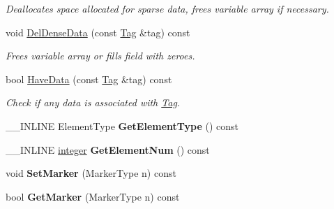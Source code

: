 \begin{DoxyCompactItemize}
\begin{DoxyCompactList}\small\item\em Deallocates space allocated for sparse data, frees variable array if necessary. \end{DoxyCompactList}\item 
\hypertarget{classINMOST_1_1Storage_af528c745af38f31bf6b8b77c1eafdb8a}{void \hyperlink{classINMOST_1_1Storage_af528c745af38f31bf6b8b77c1eafdb8a}{Del\-Dense\-Data} (const \hyperlink{classINMOST_1_1Tag}{Tag} \&tag) const }\label{classINMOST_1_1Storage_af528c745af38f31bf6b8b77c1eafdb8a}

\begin{DoxyCompactList}\small\item\em Frees variable array or fills field with zeroes. \end{DoxyCompactList}\item 
\hypertarget{classINMOST_1_1Storage_ab94105e63f94f9799ff9a58280d0bf63}{bool \hyperlink{classINMOST_1_1Storage_ab94105e63f94f9799ff9a58280d0bf63}{Have\-Data} (const \hyperlink{classINMOST_1_1Tag}{Tag} \&tag) const }\label{classINMOST_1_1Storage_ab94105e63f94f9799ff9a58280d0bf63}

\begin{DoxyCompactList}\small\item\em Check if any data is associated with \hyperlink{classINMOST_1_1Tag}{Tag}. \end{DoxyCompactList}\item 
\hypertarget{classINMOST_1_1Storage_ae6928532b6665a12831d13293c4c7b31}{\-\_\-\-\_\-\-I\-N\-L\-I\-N\-E Element\-Type {\bfseries Get\-Element\-Type} () const }\label{classINMOST_1_1Storage_ae6928532b6665a12831d13293c4c7b31}

\item 
\hypertarget{classINMOST_1_1Storage_ae29350683bf09e402e0343f758f3e9d1}{\-\_\-\-\_\-\-I\-N\-L\-I\-N\-E \hyperlink{classINMOST_1_1Storage_aec96942bc647417a801e2895b45964d2}{integer} {\bfseries Get\-Element\-Num} () const }\label{classINMOST_1_1Storage_ae29350683bf09e402e0343f758f3e9d1}

\item 
\hypertarget{classINMOST_1_1Storage_a9786e860933f2ab0970010ab4bcfc567}{void {\bfseries Set\-Marker} (Marker\-Type n) const }\label{classINMOST_1_1Storage_a9786e860933f2ab0970010ab4bcfc567}

\item 
\hypertarget{classINMOST_1_1Storage_a8cfbb42c2b3e6dbe03894c48e0ab4639}{bool {\bfseries Get\-Marker} (Marker\-Type n) const }\label{classINMOST_1_1Storage_a8cfbb42c2b3e6dbe03894c48e0ab4639}


\end{DoxyCompactItemize}
